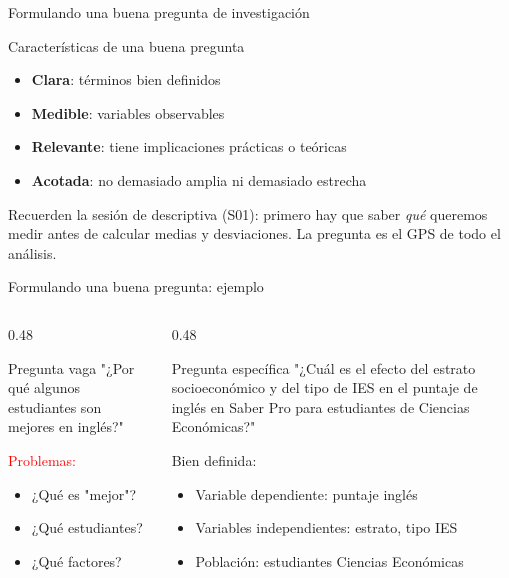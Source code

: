 \documentclass[aspectratio=169, 11pt]{beamer}
\begin{document}
\begin{frame}{Formulando una buena pregunta de investigación}
\begin{block}{Caracter\'isticas de una buena pregunta}
\begin{itemize}\setlength{\itemsep}{0pt}
\item \textbf{Clara}: t\'erminos bien definidos
\item \textbf{Medible}: variables observables
\item \textbf{Relevante}: tiene implicaciones pr\'acticas o te\'oricas
\item \textbf{Acotada}: no demasiado amplia ni demasiado estrecha
\end{itemize}
\end{block}

\small
Recuerden la sesi\'on de descriptiva (S01): primero hay que saber \textit{qu\'e} queremos medir antes de calcular medias y desviaciones. La pregunta es el GPS de todo el an\'alisis.
\end{frame}

\begin{frame}{Formulando una buena pregunta: ejemplo}
\begin{columns}
\begin{column}{0.48\textwidth}
\begin{alertblock}{Pregunta vaga}
"¿Por qué algunos estudiantes son mejores en inglés?"

\vspace{0.1cm}
\small
\textcolor{red}{Problemas:}
\begin{itemize}\setlength{\itemsep}{0pt}
\item ¿Qué es "mejor"?
\item ¿Qué estudiantes?
\item ¿Qué factores?
\end{itemize}
\end{alertblock}
\end{column}

\begin{column}{0.48\textwidth}
\begin{exampleblock}{Pregunta específica}
"¿Cuál es el efecto del estrato socioeconómico y del tipo de IES en el puntaje de inglés en Saber Pro para estudiantes de Ciencias Econ\'omicas?"

\vspace{0.1cm}
\small
\textcolor{javerianalight}{Bien definida:}
\begin{itemize}\setlength{\itemsep}{0pt}
\item Variable dependiente: puntaje inglés
\item Variables independientes: estrato, tipo IES
\item Población: estudiantes Ciencias Econ\'omicas
\end{itemize}
\end{exampleblock}
\end{column}
\end{columns}
\end{frame}
\end{document}
